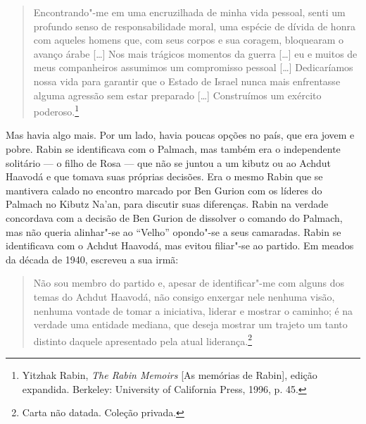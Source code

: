 \begin{quote}
Encontrando"-me em uma encruzilhada de minha vida pessoal, senti um
profundo senso de responsabilidade moral, uma espécie de dívida de honra
com aqueles homens que, com seus corpos e sua coragem, bloquearam o
avanço árabe {[}\ldots{}{]} Nos mais trágicos momentos da guerra {[}\ldots{}{]} eu e muitos de
meus companheiros assumimos um compromisso pessoal {[}\ldots{}{]} Dedicaríamos nossa
vida para garantir que o Estado de Israel nunca mais enfrentasse alguma
agressão sem estar preparado {[}\ldots{}{]} Construímos um exército
poderoso.\footnote{Yitzhak Rabin, \textit{The Rabin Memoirs} {[}As memórias de Rabin{]}, edição expandida. Berkeley:
University of California Press, 1996, p. 45.}
\end{quote}

Mas havia algo mais. Por um lado, havia poucas opções no país, que era
jovem e pobre. Rabin se identificava com o Palmach, mas também era o
independente solitário --- o filho de Rosa --- que não se juntou a um
kibutz ou ao Achdut Haavodá e que tomava suas próprias decisões. Era o
mesmo Rabin que se mantivera calado no encontro marcado por Ben
Gurion com os líderes do Palmach no Kibutz Na'an, para discutir suas
diferenças. Rabin na verdade concordava com a decisão de Ben Gurion de
dissolver o comando do Palmach, mas não queria alinhar"-se ao ``Velho''
opondo"-se a seus camaradas. Rabin se identificava com o Achdut Haavodá,
mas evitou filiar"-se ao partido. Em meados da década de 1940, escreveu a
sua irmã: 

\begin{quote}
Não sou membro do partido e, apesar de identificar"-me com
alguns dos temas do Achdut Haavodá, não consigo enxergar nele nenhuma
visão, nenhuma vontade de tomar a iniciativa, liderar e mostrar o
caminho; é na verdade uma entidade mediana, que deseja mostrar um
trajeto um tanto distinto daquele apresentado pela atual
liderança.\footnote{Carta não datada. Coleção privada.}
\end{quote}

